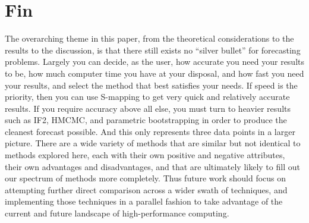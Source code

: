 \section{Fin}

	The overarching theme in this paper, from the theoretical considerations to the results to the discussion, is that there still exists no ``silver bullet'' for forecasting problems. Largely you can decide, as the user, how accurate you need your results to be, how much computer time you have at your disposal, and how fast you need your results, and select the method that best satisfies your needs. If speed is the priority, then you can use S-mapping to get very quick and relatively accurate results. If you require accuracy above all else, you must turn to heavier results such as IF2, HMCMC, and parametric bootstrapping in order to produce the cleanest forecast possible. And this only represents three data points in a larger picture. There are a wide variety of methods that are similar but not identical to methods explored here, each with their own positive and negative attributes, their own advantages and disadvantages, and that are ultimately likely to fill out our spectrum of methods more completely. Thus future work should focus on attempting further direct comparison across a wider swath of techniques, and implementing those techniques in a parallel fashion to take advantage of the current and future landscape of high-performance computing.